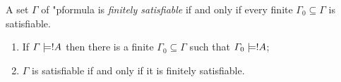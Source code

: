 \documentclass[../../include/open-logic-section]{subfiles}
\begin{document}

\begin{defn}
  A set $\Gamma$ of "p{formula} is \emph{finitely satisfiable} if and
  only if every finite $\Gamma_0 \subseteq \Gamma$ is satisfiable.
\end{defn}

\begin{thm}
\begin{enumerate}
  \item If $\Gamma \Entails !A$ then there is a finite $\Gamma_0
    \subseteq \Gamma$ such that $\Gamma_0 \Entails !A$;
  \item $\Gamma$ is satisfiable if and only if it is finitely
    satisfiable. 
\end{enumerate}
\end{thm}

\end{document}
